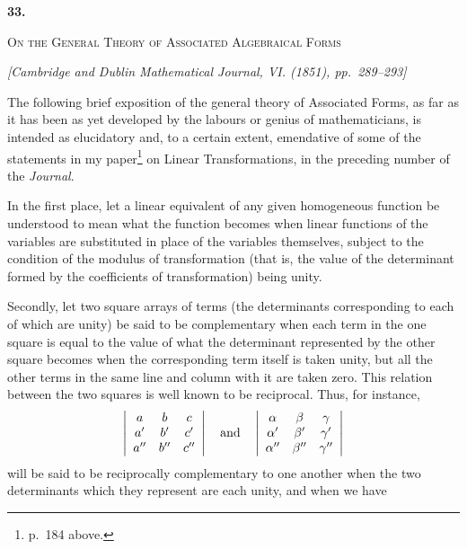 \documentclass[11pt]{article}
\newcommand{\paperhead}[3]{%
  \clearpage
  \begin{center}
  {\Large\bfseries #1.}\par\vspace{0.85em}
  {\large\scshape #2}\par\vspace{0.6em}
  {\itshape [#3]}\par
  \end{center}\vspace{0.4em}}
\newcommand{\sourcepage}[1]{\marginpar{\scriptsize p.~#1}}
\begin{document}
{{\paperhead{33}{On the General Theory of Associated Algebraical Forms}{Cambridge and Dublin Mathematical Journal, VI. (1851), pp.~289--293}

\sourcepage{198}
The following brief exposition of the general theory of Associated Forms, as far as it has been as yet developed by the labours or genius of mathematicians, is intended as elucidatory and, to a certain extent, emendative of some of the statements in my paper\footnote{p.~184 above.} on Linear Transformations, in the preceding number of the \emph{Journal}.

In the first place, let a linear equivalent of any given homogeneous function be understood to mean what the function becomes when linear functions of the variables are substituted in place of the variables themselves, subject to the condition of the modulus of transformation (that is, the value of the determinant formed by the coefficients of transformation) being unity.

Secondly, let two square arrays of terms (the determinants corresponding to each of which are unity) be said to be complementary when each term in the one square is equal to the value of what the determinant represented by the other square becomes when the corresponding term itself is taken unity, but all the other terms in the same line and column with it are taken zero. This relation between the two squares is well known to be reciprocal. Thus, for instance,
\[
\left|\begin{array}{ccc}
a&b&c\\
a'&b'&c'\\
a''&b''&c''
\end{array}\right|
\quad\hbox{and}\quad
\left|\begin{array}{ccc}
\alpha&\beta&\gamma\\
\alpha'&\beta'&\gamma'\\
\alpha''&\beta''&\gamma''
\end{array}\right|
\]
will be said to be reciprocally complementary to one another when the two determinants which they represent are each unity, and when we have

}}
\end{document}

